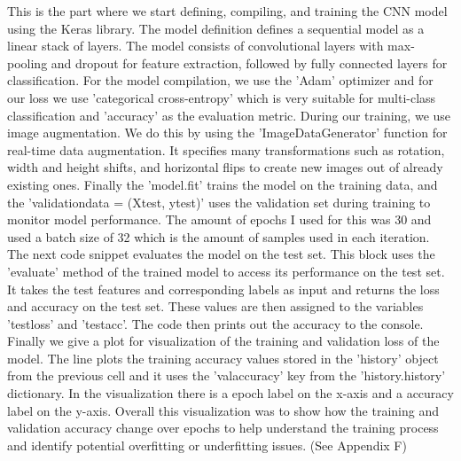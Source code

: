 \documentclass[paper=a4, fontsize=11pt,twoside]{scrartcl}
\begin{document}
This is the part where we start defining, compiling, and training the CNN model using the Keras library. The model definition defines a sequential model as a linear stack of layers. The model consists of convolutional layers with max-pooling and dropout for feature extraction, followed by fully connected layers for classification. For the model compilation, we use the 'Adam' optimizer and for our loss we use 'categorical cross-entropy' which is very suitable for multi-class classification and 'accuracy' as the evaluation metric. During our training, we use image augmentation. We do this by using the 'ImageDataGenerator' function for real-time data augmentation. It specifies many transformations such as rotation, width and height shifts, and horizontal flips to create new images out of already existing ones. Finally the 'model.fit' trains the model on the training data, and the 'validation\textunderscore data = (X\textunderscore test, y\textunderscore test)' uses the validation set during training to monitor model performance. The amount of epochs I used for this was 30 and used a batch size of 32 which is the amount of samples used in each iteration. The next code snippet evaluates the model on the test set. This block uses the 'evaluate' method of the trained model to access its performance on the test set. It takes the test features and corresponding labels as input and returns the loss and accuracy on the test set. These values are then assigned to the variables 'test\textunderscore loss' and 'test\textunderscore acc'. The code then prints out the accuracy to the console. Finally we give a plot for visualization of the training and validation loss of the model. The line plots the training accuracy values stored in the 'history' object from the previous cell and it uses the 'val\textunderscore accuracy' key from the 'history.history' dictionary. In the visualization there is a epoch label on the x-axis and a accuracy label on the y-axis. Overall this visualization was to show how the training and validation accuracy change over epochs to help understand the training process and identify potential overfitting or underfitting issues. (See Appendix F) \\ 
\end{document}
